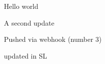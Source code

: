 \documentclass{article}
\begin{document}
Hello world

A second update

Pushed via webhook (number 3)

updated in SL
\end{document}
